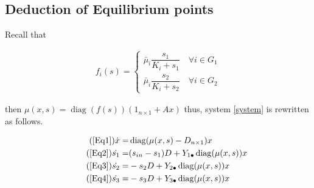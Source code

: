 \documentclass[3p,times]{article}
\DeclareMathOperator{\diag}{diag}
\begin{document}
\subsection{Deduction of  Equilibrium points}


Recall that 

\begin{align}
f_i(s) = \begin{cases}
\bar{\mu}_i \dfrac{s_1}{K_i + s_1} \quad \forall i \in G_1 \\
\bar{\mu}_i \dfrac{s_2}{K_i + s_2} \quad \forall i \in G_2
\end{cases}
\end{align}

then $\mu(x,s) = \diag(f(s))(1_{n\times 1} + Ax)$ thus, system \eqref{system} is rewritten as follows. 

\begin{align}
\tag{\ref{Eq1}}	\dot{x} = & \diag(\mu(x,s) - D_{n\times 1})x \\
\tag{\ref{Eq2}}	\dot{s_1} = & (s_{in}-s_1)D + Y_{1\bullet} \diag(\mu(x,s))x \\
\tag{\ref{Eq3}}	\dot{s_2} = & -s_2D+
Y_{2\bullet} \diag(\mu(x,s))x\\	
\tag{\ref{Eq4}}	\dot{s_3} = & -s_3D+Y_{3\bullet} \diag(\mu(x,s))x 
\end{align} 
\end{document}

